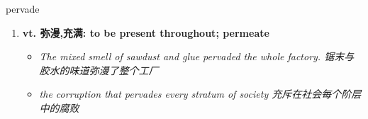 
\begin{frame}
{\huge pervade}
\begin{center}
\begin{enumerate}\Large
  \item \textbf{vt. 弥漫,充满: to be present throughout; permeate}
  \begin{itemize}
    \item \em{\Large{The mixed smell of sawdust and glue pervaded the whole factory. 锯末与胶水的味道弥漫了整个工厂}}
    \item \em{\Large{the corruption that pervades every stratum of society 充斥在社会每个阶层中的腐败}}
  \end{itemize}
\end{enumerate}
\end{center}
\end{frame}
